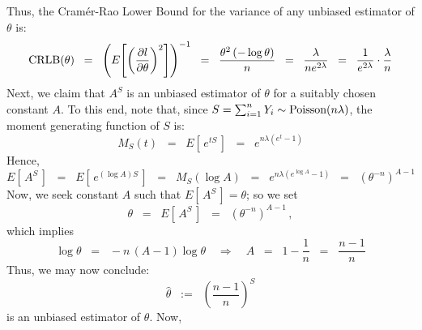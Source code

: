 Thus, the Cram\'er-Rao Lower Bound for the variance of any unbiased estimator of $\theta$ is:
\begin{equation*}
\textnormal{CRLB}(\theta)
\;\;=\;\; \left(E\!\left[\left(\dfrac{\partial l}{\partial\theta}\right)^{2}\right]\right)^{-1}
\;\;=\;\; \dfrac{\theta^{2}\left(-\log\theta\right)}{n}
\;\;=\;\; \dfrac{\lambda}{ne^{2\lambda}}
\;\;=\;\; \dfrac{1}{e^{2\lambda}}\cdot\dfrac{\lambda}{n}
\end{equation*}
Next, we claim that $A^{S}$ is an unbiased estimator of $\theta$ for a suitably chosen constant $A$.
To this end, note that, since $S = \sum_{i=1}^{n}Y_{i} \sim \textnormal{Poisson}(n\lambda)$, the moment generating function of $S$ is:
\begin{equation*}
M_{S}(t)
\;\;=\;\; E\!\left[\,e^{tS}\,\right]
\;\;=\;\; e^{n\lambda\left(e^{t}-1\right)}
\end{equation*}
Hence,
\begin{equation*}
E\!\left[\,A^{S}\,\right]
\;\;=\;\; E\!\left[\,e^{(\log A)S}\,\right]
\;\;=\;\; M_{S}\!\left(\log A\right)
\;\;=\;\; e^{n\lambda\left(e^{\log A}-1\right)}
\;\;=\;\; \left(\theta^{-n}\right)^{A-1}
\end{equation*}
Now, we seek constant $A$ such that $E\!\left[\,A^{S}\,\right] = \theta$; so we set
\begin{equation*}
\theta
\;\;=\;\; E\!\left[\,A^{S}\,\right]
\;\;=\;\; \left(\theta^{-n}\right)^{A-1}\,,
\end{equation*}
which implies
\begin{equation*}
\log\theta
\;\;=\;\; -n\,(A-1)\log\theta
\quad\Longrightarrow\quad
A \;\;=\;\; 1 - \dfrac{1}{n} \;\; = \;\; \dfrac{n-1}{n}
\end{equation*}
Thus, we may now conclude:
\begin{equation*}
\widehat{\theta} \;\; := \;\; \left(\dfrac{n-1}{n}\right)^{S}
\end{equation*}
is an unbiased estimator of $\theta$.
Now,

